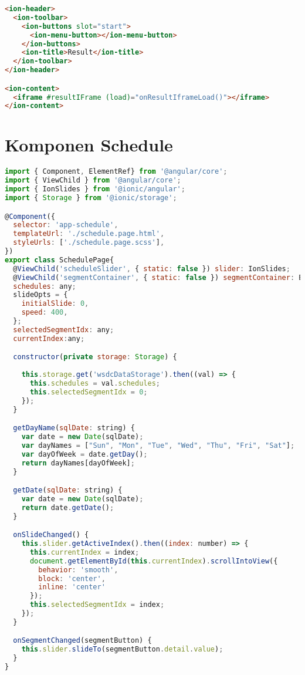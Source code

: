 \begin{lstlisting}[language=html, label={lst:result.page.html}, caption=result.page.html]
<ion-header>
  <ion-toolbar>
    <ion-buttons slot="start">
      <ion-menu-button></ion-menu-button>
    </ion-buttons>
    <ion-title>Result</ion-title>
  </ion-toolbar>
</ion-header>

<ion-content>
  <iframe #resultIFrame (load)="onResultIframeLoad()"></iframe>
</ion-content>

\end{lstlisting}

\section{Komponen Schedule} 
\label{sec:lampiranKomponenSchedule}

\begin{lstlisting}[language=JavaScript, label={lst:schedule.page.ts}, caption=schedule.page.ts]
import { Component, ElementRef} from '@angular/core';
import { ViewChild } from '@angular/core';
import { IonSlides } from '@ionic/angular';
import { Storage } from '@ionic/storage';

@Component({
  selector: 'app-schedule',
  templateUrl: './schedule.page.html',
  styleUrls: ['./schedule.page.scss'],
})
export class SchedulePage{
  @ViewChild('scheduleSlider', { static: false }) slider: IonSlides;
  @ViewChild('segmentContainer', { static: false }) segmentContainer: ElementRef;
  schedules: any;
  slideOpts = {
    initialSlide: 0,
    speed: 400,
  };
  selectedSegmentIdx: any;
  currentIndex:any;

  constructor(private storage: Storage) {
    
    this.storage.get('wsdcDataStorage').then((val) => {
      this.schedules = val.schedules;
      this.selectedSegmentIdx = 0;
    });
  }

  getDayName(sqlDate: string) {
    var date = new Date(sqlDate);
    var dayNames = ["Sun", "Mon", "Tue", "Wed", "Thu", "Fri", "Sat"];
    var dayOfWeek = date.getDay();
    return dayNames[dayOfWeek];
  }

  getDate(sqlDate: string) {
    var date = new Date(sqlDate);
    return date.getDate();
  }

  onSlideChanged() {
    this.slider.getActiveIndex().then((index: number) => {
      this.currentIndex = index;
      document.getElementById(this.currentIndex).scrollIntoView({
        behavior: 'smooth',
        block: 'center',
        inline: 'center'
      });
      this.selectedSegmentIdx = index;
    });
  }

  onSegmentChanged(segmentButton) {
    this.slider.slideTo(segmentButton.detail.value);
  }
}

\end{lstlisting} 

